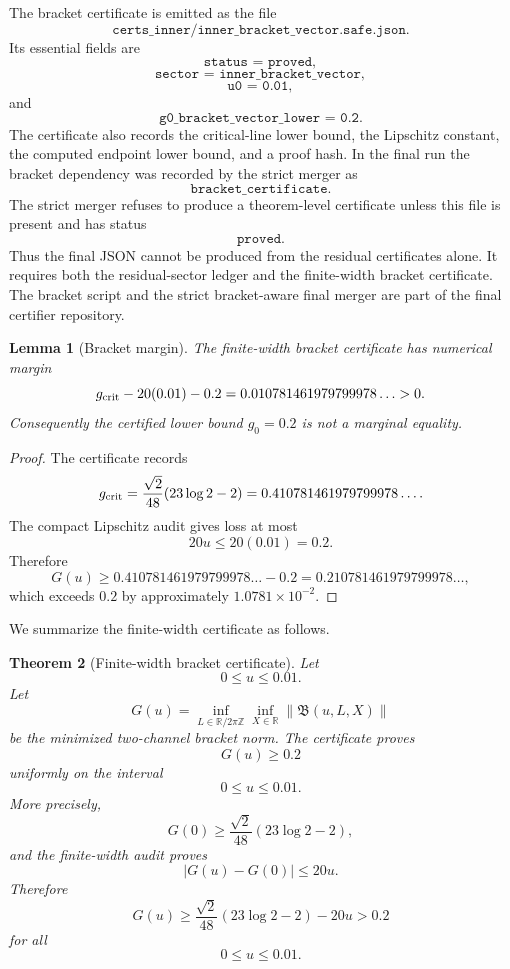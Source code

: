 \documentclass[11pt]{article}
\newtheorem{theorem}{Theorem}[section]
\newtheorem{lemma}[theorem]{Lemma}
\newcommand{\Bvec}{\mathfrak B}
\newcommand{\JSON}[1]{\texttt{#1}}
\newcommand{\code}[1]{\texttt{#1}}
\begin{document}
The bracket certificate is emitted as the file
\[
        \code{certs\_inner/inner\_bracket\_vector.safe.json}.
\]
Its essential fields are
\[
        \JSON{status = proved},
\]
\[
        \JSON{sector = inner\_bracket\_vector},
\]
\[
        \JSON{u0 = 0.01},
\]
and
\[
        \JSON{g0\_bracket\_vector\_lower = 0.2}.
\]
The certificate also records the critical-line lower bound, the Lipschitz
constant, the computed endpoint lower bound, and a proof hash.  In the final
run the bracket dependency was recorded by the strict merger as
\[
        \JSON{bracket\_certificate}.
\]
The strict merger refuses to produce a theorem-level certificate unless this
file is present and has status
\[
        \JSON{proved}.
\]
Thus the final JSON cannot be produced from the residual certificates alone.
It requires both the residual-sector ledger and the finite-width bracket
certificate.  The bracket script and the strict bracket-aware final merger are
part of the final certifier repository. 

\begin{lemma}[Bracket margin]
The finite-width bracket certificate has numerical margin
\[
        g_{\rm crit}-20(0.01)-0.2
        =
        0.010781461979799978\ldots
        >
        0.
\]
Consequently the certified lower bound \(g_0=0.2\) is not a marginal equality.
\end{lemma}

\begin{proof}
The certificate records
\[
        g_{\rm crit}
        =
        \frac{\sqrt2}{48}(23\log2-2)
        =
        0.410781461979799978\ldots.
\]
The compact Lipschitz audit gives loss at most
\[
        20u\le20(0.01)=0.2.
\]
Therefore
\[
        G(u)\ge0.410781461979799978\ldots-0.2
        =
        0.210781461979799978\ldots,
\]
which exceeds \(0.2\) by approximately \(1.0781\times10^{-2}\).
\end{proof}

We summarize the finite-width certificate as follows.

\begin{theorem}[Finite-width bracket certificate]
Let
\[
        0\le u\le0.01.
\]
Let
\[
        G(u)
        =
        \inf_{L\in\mathbb R/2\pi\mathbb Z}
        \inf_{X\in\mathbb R}
        \|\Bvec(u,L,X)\|
\]
be the minimized two-channel bracket norm.  The certificate proves
\[
        G(u)\ge0.2
\]
uniformly on the interval
\[
        0\le u\le0.01.
\]
More precisely,
\[
        G(0)
        \ge
        \frac{\sqrt2}{48}(23\log2-2),
\]
and the finite-width audit proves
\[
        |G(u)-G(0)|\le20u.
\]
Therefore
\[
        G(u)
        \ge
        \frac{\sqrt2}{48}(23\log2-2)-20u
        >
        0.2
\]
for all
\[
        0\le u\le0.01.
\]
\end{theorem}
\end{document}
